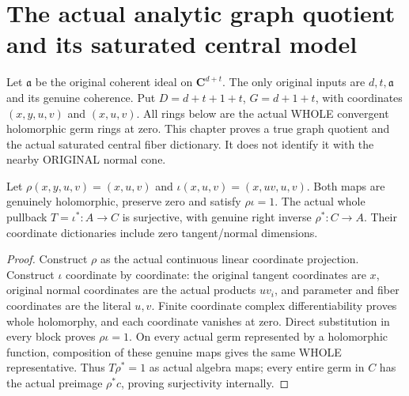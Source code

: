 \section{The actual analytic graph quotient and its saturated central model}
Let $\mathfrak a$ be the original coherent ideal on $\mathbf C^{d+t}$.
The only original inputs are $d,t,\mathfrak a$ and its genuine coherence.
Put $D=d+t+1+t$, $G=d+1+t$, with coordinates $(x,y,u,v)$ and $(x,u,v)$.
All rings below are the actual WHOLE convergent holomorphic germ rings at zero.
This chapter proves a true graph quotient and the actual saturated central
fiber dictionary. It does not identify it with the nearby ORIGINAL normal cone.

\begin{theorem}
\label{hir:relative-normal-analytic-graph-split-surjection}
\leanok
{}
Let $\rho(x,y,u,v)=(x,u,v)$ and $\iota(x,u,v)=(x,uv,u,v)$.
Both maps are genuinely holomorphic, preserve zero and satisfy
$\rho\iota=1$. The actual whole pullback $T=\iota^*:A\to C$
is surjective, with genuine right inverse $\rho^*:C\to A$.
Their coordinate dictionaries include zero tangent/normal dimensions.
\end{theorem}
\begin{proof}
Construct $\rho$ as the actual continuous linear coordinate projection.
Construct $\iota$ coordinate by coordinate: the original tangent coordinates
are $x$, original normal coordinates are the actual products $uv_i$, and
parameter and fiber coordinates are the literal $u,v$. Finite coordinate
complex differentiability proves whole holomorphy, and each coordinate
vanishes at zero. Direct substitution in every block proves $\rho\iota=1$.
On every actual germ represented by a holomorphic function, composition
of these genuine maps gives the same WHOLE representative. Thus
$T\rho^*=1$ as actual algebra maps; every entire germ in $C$ has the
actual preimage $\rho^*c$, proving surjectivity internally.
\end{proof}

